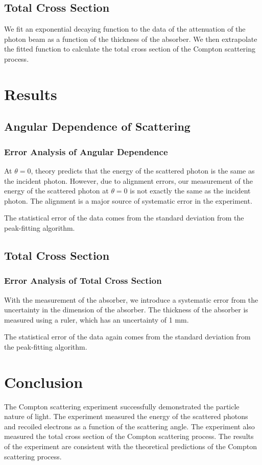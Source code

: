 \subsection{Total Cross Section}
We fit an exponential decaying function to the data of the attenuation of the photon beam as a function of the thickness of the absorber. We then extrapolate the fitted function to calculate the total cross section of the Compton scattering process. 

\section{Results}
\subsection{Angular Dependence of Scattering}
\subsubsection{Error Analysis of Angular Dependence}
At $\theta = 0$, theory predicts that the energy of the scattered photon is the same as the incident photon. However, due to alignment errors, our measurement of the energy of the scattered photon at $\theta = 0$ is not exactly the same as the incident photon. The alignment is a major source of systematic error in the experiment.

The statistical error of the data comes from the standard deviation from the peak-fitting algorithm. 

\subsection{Total Cross Section}
\subsubsection{Error Analysis of Total Cross Section}
With the measurement of the absorber, we introduce a systematic error from the uncertainty in the dimension of the absorber. The thickness of the absorber is measured using a ruler, which has an uncertainty of 1 mm. 

The statistical error of the data again comes from the standard deviation from the peak-fitting algorithm. 



 

\section{Conclusion}
The Compton scattering experiment successfully demonstrated the particle nature of light. The experiment measured the energy of the scattered photons and recoiled electrons as a function of the scattering angle. The experiment also measured the total cross section of the Compton scattering process. The results of the experiment are consistent with the theoretical predictions of the Compton scattering process.

